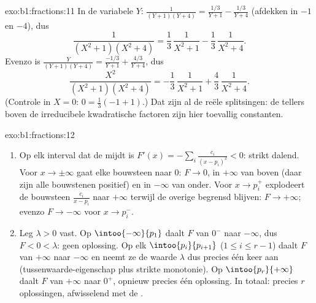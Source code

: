 \begin{solution}{exo:b1:fractions:11}
In de variabele $Y$: $\frac1{(Y+1)(Y+4)} = \frac{1/3}{Y+1} -
\frac{1/3}{Y+4}$ (afdekken in $-1$ en $-4$), dus
\[
\frac{1}{(X^2+1)(X^2+4)}
= \frac13\,\frac1{X^2+1} - \frac13\,\frac1{X^2+4} .
\]
Evenzo is $\frac{Y}{(Y+1)(Y+4)} = \frac{-1/3}{Y+1} + \frac{4/3}{Y+4}$,
dus
\[
\frac{X^2}{(X^2+1)(X^2+4)}
= -\frac13\,\frac1{X^2+1} + \frac43\,\frac1{X^2+4} .
\]
(Controle in $X = 0$: $0 = \frac13(-1 + 1)$.) Dat zijn al de reële
splitsingen: de tellers boven de irreducibele kwadratische factoren zijn
hier toevallig constanten.
\end{solution}

\begin{solution}{exo:b1:fractions:12}
\begin{enumerate}
  \item Op elk interval dat de  mijdt is $F'(x) = -\sum_i
        \frac{c_i}{(x - p_i)^2} < 0$: strikt dalend. Voor $x \to
        \pm\infty$ gaat elke bouwsteen naar $0$: $F \to 0$, in
        $+\infty$ van boven (daar zijn alle bouwstenen positief) en in
        $-\infty$ van onder. Voor $x \to p_i^+$ explodeert de bouwsteen
        $\frac{c_i}{x - p_i}$ naar $+\infty$ terwijl de overige begrensd
        blijven: $F \to +\infty$; evenzo $F \to -\infty$ voor $x \to
        p_i^-$.
  \item Leg $\lambda > 0$ vast. Op $\intoo{-\infty}{p_1}$ daalt $F$ van
        $0^-$ naar $-\infty$, dus $F < 0 < \lambda$: geen oplossing. Op
        elk $\intoo{p_i}{p_{i+1}}$ ($1 \leq i \leq r-1$) daalt $F$ van
        $+\infty$ naar $-\infty$ en neemt ze de waarde $\lambda$ dus
        precies één keer aan (tussenwaarde-eigenschap plus strikte
        monotonie). Op $\intoo{p_r}{+\infty}$ daalt $F$ van $+\infty$
        naar $0^+$, opnieuw precies één oplossing. In totaal: precies
        $r$ oplossingen, afwisselend met de .
\end{enumerate}
\end{solution}

